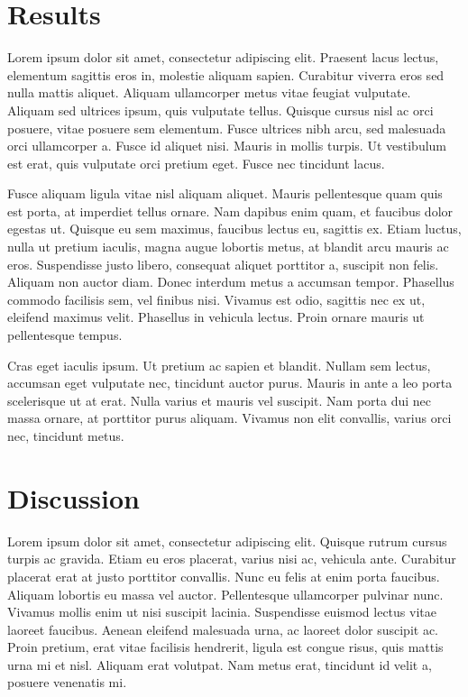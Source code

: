 \documentclass[10pt,twocolumn]{revtex4-2}    %
\begin{document}
\section{Results} 

Lorem ipsum dolor sit amet, consectetur adipiscing elit. Praesent lacus lectus, elementum sagittis eros in, molestie aliquam sapien. Curabitur viverra eros sed nulla mattis aliquet. Aliquam ullamcorper metus vitae feugiat vulputate. Aliquam sed ultrices ipsum, quis vulputate tellus. Quisque cursus nisl ac orci posuere, vitae posuere sem elementum. Fusce ultrices nibh arcu, sed malesuada orci ullamcorper a. Fusce id aliquet nisi. Mauris in mollis turpis. Ut vestibulum est erat, quis vulputate orci pretium eget. Fusce nec tincidunt lacus.

Fusce aliquam ligula vitae nisl aliquam aliquet. Mauris pellentesque quam quis est porta, at imperdiet tellus ornare. Nam dapibus enim quam, et faucibus dolor egestas ut. Quisque eu sem maximus, faucibus lectus eu, sagittis ex. Etiam luctus, nulla ut pretium iaculis, magna augue lobortis metus, at blandit arcu mauris ac eros. Suspendisse justo libero, consequat aliquet porttitor a, suscipit non felis. Aliquam non auctor diam. Donec interdum metus a accumsan tempor. Phasellus commodo facilisis sem, vel finibus nisi. Vivamus est odio, sagittis nec ex ut, eleifend maximus velit. Phasellus in vehicula lectus. Proin ornare mauris ut pellentesque tempus.

Cras eget iaculis ipsum. Ut pretium ac sapien et blandit. Nullam sem lectus, accumsan eget vulputate nec, tincidunt auctor purus. Mauris in ante a leo porta scelerisque ut at erat. Nulla varius et mauris vel suscipit. Nam porta dui nec massa ornare, at porttitor purus aliquam. Vivamus non elit convallis, varius orci nec, tincidunt metus.

\section{Discussion} 

Lorem ipsum dolor sit amet, consectetur adipiscing elit. Quisque rutrum cursus turpis ac gravida. Etiam eu eros placerat, varius nisi ac, vehicula ante. Curabitur placerat erat at justo porttitor convallis. Nunc eu felis at enim porta faucibus. Aliquam lobortis eu massa vel auctor. Pellentesque ullamcorper pulvinar nunc. Vivamus mollis enim ut nisi suscipit lacinia. Suspendisse euismod lectus vitae laoreet faucibus. Aenean eleifend malesuada urna, ac laoreet dolor suscipit ac. Proin pretium, erat vitae facilisis hendrerit, ligula est congue risus, quis mattis urna mi et nisl. Aliquam erat volutpat. Nam metus erat, tincidunt id velit a, posuere venenatis mi.
\end{document}
